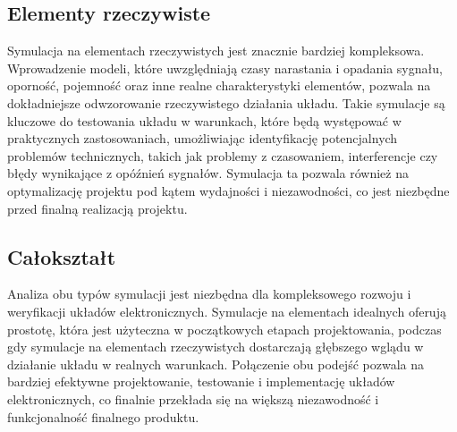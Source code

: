 \documentclass{article}
\begin{document}
\subsection {Elementy rzeczywiste}
Symulacja na elementach rzeczywistych jest znacznie bardziej kompleksowa. Wprowadzenie modeli, które uwzględniają czasy narastania i opadania sygnału, oporność, pojemność oraz inne realne charakterystyki elementów, pozwala na dokładniejsze odwzorowanie rzeczywistego działania układu. Takie symulacje są kluczowe do testowania układu w warunkach, które będą występować w praktycznych zastosowaniach, umożliwiając identyfikację potencjalnych problemów technicznych, takich jak problemy z czasowaniem, interferencje czy błędy wynikające z opóźnień sygnałów. Symulacja ta pozwala również na optymalizację projektu pod kątem wydajności i niezawodności, co jest niezbędne przed finalną realizacją projektu.
\subsection {Całokształt}
Analiza obu typów symulacji jest niezbędna dla kompleksowego rozwoju i weryfikacji układów elektronicznych. Symulacje na elementach idealnych oferują prostotę, która jest użyteczna w początkowych etapach projektowania, podczas gdy symulacje na elementach rzeczywistych dostarczają głębszego wglądu w działanie układu w realnych warunkach. Połączenie obu podejść pozwala na bardziej efektywne projektowanie, testowanie i implementację układów elektronicznych, co finalnie przekłada się na większą niezawodność i funkcjonalność finalnego produktu.

\newpage
\end{document}
